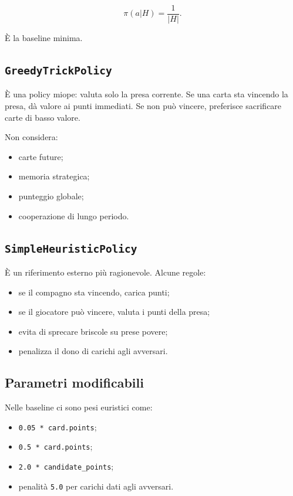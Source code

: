 \documentclass[11pt,a4paper]{article}
\begin{document}
\[
\pi(a|H)=\frac{1}{|H|}.
\]

È la baseline minima.

\subsection{\texttt{GreedyTrickPolicy}}

È una policy miope: valuta solo la presa corrente. Se una carta sta vincendo la
presa, dà valore ai punti immediati. Se non può vincere, preferisce sacrificare
carte di basso valore.

Non considera:

\begin{itemize}
  \item carte future;
  \item memoria strategica;
  \item punteggio globale;
  \item cooperazione di lungo periodo.
\end{itemize}

\subsection{\texttt{SimpleHeuristicPolicy}}

È un riferimento esterno più ragionevole. Alcune regole:

\begin{itemize}
  \item se il compagno sta vincendo, carica punti;
  \item se il giocatore può vincere, valuta i punti della presa;
  \item evita di sprecare briscole su prese povere;
  \item penalizza il dono di carichi agli avversari.
\end{itemize}

\subsection{Parametri modificabili}

Nelle baseline ci sono pesi euristici come:

\begin{itemize}
  \item \texttt{0.05 * card.points};
  \item \texttt{0.5 * card.points};
  \item \texttt{2.0 * candidate\_points};
  \item penalità \texttt{5.0} per carichi dati agli avversari.
\end{itemize}
\end{document}
